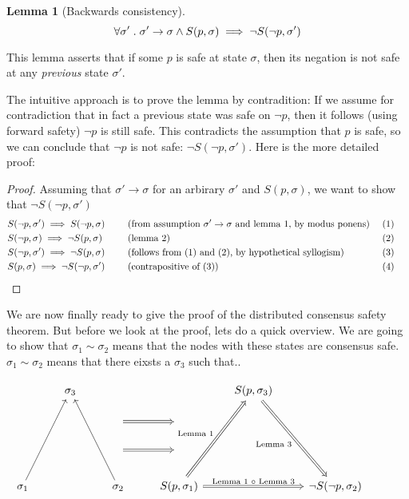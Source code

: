 \documentclass{article}
\theoremstyle{definition}
\newtheorem{lemma}{Lemma}
\begin{document}
\begin{lemma}[Backwards consistency]
$$
\forall \sigma' \hspace{1mm}.\hspace{1mm} \sigma' \to \sigma \land S(p,\sigma) \implies \neg{S(\neg{p},\sigma')}
$$
\end{lemma}

This lemma asserts that if some $p$ is safe at state $\sigma$, then its negation is not safe at any \emph{previous} state $\sigma'$.

The intuitive approach is to prove the lemma by contradition: If we assume for contradiction that in fact a previous state was safe on $\neg{p}$, then it follows (using forward safety) $\neg{p}$ is still safe. This contradicts the assumption that $p$ is safe, so we can conclude that $\neg{p}$ is not safe: $\neg{S(\neg{p},\sigma')}$. Here is the more detailed proof:

\begin{proof}
  Assuming that $\sigma' \to \sigma$ for an arbirary $\sigma'$ and $S(p,\sigma)$, we want to show that $\neg{S(\neg{p},\sigma')}$
  \begin{align*}
    &S(\neg{p},\sigma') \implies S(\neg{p},\sigma) &&\text{(from assumption $\sigma' \to \sigma$ and lemma 1, by modus ponens) }   &&\text{(1)} \\
    &S(\neg{p},\sigma) \implies \neg{S(p,\sigma)} &&\text{(lemma 2) }   &&\text{(2)} \\
    &S(\neg{p},\sigma') \implies \neg{S(p,\sigma)} &&\text{(follows from (1) and (2), by hypothetical syllogism)} &&\text{(3)} \\
    &S(p,\sigma) \implies \neg{S(\neg{p},\sigma')} \hspace{5mm} \qedhere &&\text{(contrapositive of (3))} &&\text{(4)} \hspace{5mm}
  \end{align*}
\end{proof}

\vspace{5mm}

We are now finally ready to give the proof of the distributed consensus safety theorem. But before we look at the proof, lets do a quick overview. We are going to show that $\sigma_1 \sim \sigma_2$ means that the nodes with these states are consensus safe. $\sigma_1 \sim \sigma_2$ means that there eixsts a $\sigma_3$ such that..


\begin{equation*}
\begin{tikzcd}
{}
  &
\sigma_3
  &
{}
  &
{}
  &
S(p,\sigma_3)
  &
{}
  &
{}
  \\ 
{}
  &
{}
  &
{}
  \arrow[r,Rightarrow,""]
  &
{}
  &
{}
  &
{}
  &
{}
  \\
{}
  &
{}
  &
{}
  \arrow[r,Rightarrow,""]
  &
{}
  &
{}
  &
{}
  &
{}
  \\
\sigma_1
  \arrow[uuur,""]
  &
{}
  &
\sigma_2
  \arrow[uuul,""]
{}
  &
S(p,\sigma_1)
  \arrow[uuur,Rightarrow,"\text{Lemma 1}"]
  \arrow[rr,Rightarrow,"\text{Lemma 1 $\circ$ Lemma 3}"]
  &
{}
  &
\neg{S(\neg{p},\sigma_2)}
  \arrow[uuul,Leftarrow,"\text{Lemma 3}"] 
\end{tikzcd}
\end{equation*}
\end{document}
